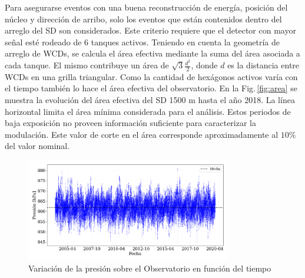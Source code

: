 Para asegurarse eventos con una buena reconstrucción de  energía, posición del núcleo y dirección de arribo, solo los eventos que están contenidos dentro del arreglo del SD son considerados. Este criterio requiere que el detector con mayor señal esté rodeado de 6 tanques activos. Teniendo en cuenta la geometría de arreglo de WCDs, se calcula el área efectiva mediante la suma del área asociada a cada tanque. El mismo contribuye un área de $\sqrt{3} \frac{d^2}{2}$, donde $d$ es la distancia entre WCDs en una grilla triangular. Como la cantidad de hexágonos activos varía con el tiempo también lo hace  el área efectiva del observatorio. En la Fig.\,\ref{fig:area} se muestra la evolución del área efectiva del SD 1500 m hasta el año 2018. La línea horizontal  limita el área mínima considerada para el análisis. Estos periodos de baja exposición no proveen información suficiente para caracterizar la modulación.
Este valor de corte en el área corresponde aproximadamente al $10\%$ del valor nominal.

\begin{figure}[H]
	\centering
		\includegraphics[width=0.8\textwidth]{Graphs/clima/presion_v2.png}
	\caption{Variación de la presión sobre el Observatorio en función del tiempo}
  \label{fig:clima_p}
\end{figure}


